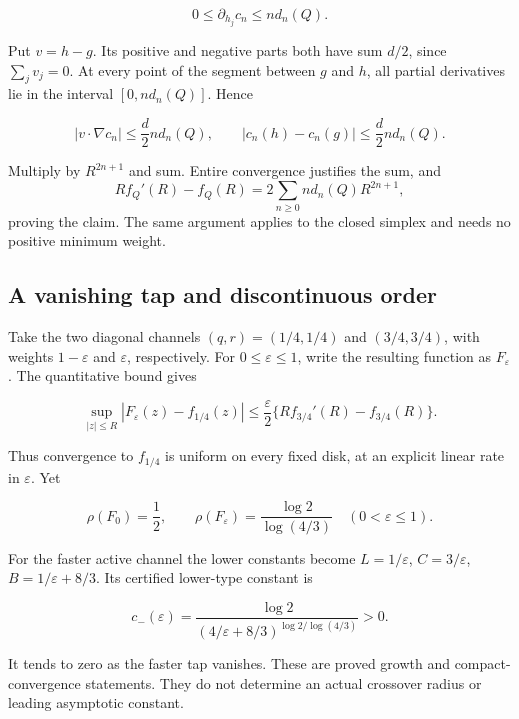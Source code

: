 \[
0\le\partial_{h_j}c_n\le n d_n(Q).
\]

Put \(v=h-g\). Its positive and negative parts both have sum \(d/2\),
since \(\sum_jv_j=0\). At every point of the segment between \(g\) and
\(h\), all partial derivatives lie in the interval \([0,n d_n(Q)]\).
Hence

\[
|v\cdot\nabla c_n|\le\frac d2 n d_n(Q),\qquad
|c_n(h)-c_n(g)|\le\frac d2 n d_n(Q).
\]

Multiply by \(R^{2n+1}\) and sum. Entire convergence justifies the sum,
and
\[R f_Q'(R)-f_Q(R)=2\sum_{n\ge0}n d_n(Q)R^{2n+1},\]
proving the
claim. The same argument applies to the closed simplex and needs no
positive minimum weight.

\hypertarget{a-vanishing-tap-and-discontinuous-order}{%
\subsection{A vanishing tap and discontinuous
order}\label{a-vanishing-tap-and-discontinuous-order}}

Take the two diagonal channels \((q,r)=(1/4,1/4)\) and \((3/4,3/4)\),
with weights \(1-\varepsilon\) and \(\varepsilon\), respectively. For
\(0\le\varepsilon\le1\), write the resulting function as
\(F_\varepsilon\). The quantitative bound gives

\[
\sup_{|z|\le R}|F_\varepsilon(z)-f_{1/4}(z)|
\le\frac{\varepsilon}{2}\{R f_{3/4}'(R)-f_{3/4}(R)\}.
\]

Thus convergence to \(f_{1/4}\) is uniform on every fixed disk, at an
explicit linear rate in \(\varepsilon\). Yet

\[
\rho(F_0)=\frac12,\qquad
\rho(F_\varepsilon)=\frac{\log2}{\log(4/3)}
\quad(0<\varepsilon\le1).
\]

For the faster active channel the lower constants become
\(L=1/\varepsilon\), \(C=3/\varepsilon\), \(B=1/\varepsilon+8/3\). Its
certified lower-type constant is

\[
c_-(\varepsilon)=\frac{\log2}{(4/\varepsilon+8/3)^{\log2/\log(4/3)}}>0.
\]

It tends to zero as the faster tap vanishes. These are proved growth and
compact-convergence statements. They do not determine an actual
crossover radius or leading asymptotic constant.

